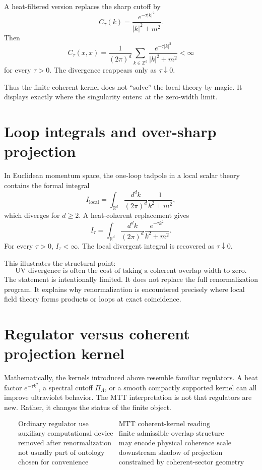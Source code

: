 \documentclass[11pt]{article}
\begin{document}
A heat-filtered version replaces the sharp cutoff by
\[
C_\tau(k)=\frac{e^{-\tau |k|^2}}{|k|^2+m^2}.
\]
Then
\[
C_\tau(x,x)=\frac{1}{(2\pi)^d}
\sum_{k\in\mathbb Z^d}
\frac{e^{-\tau |k|^2}}{|k|^2+m^2}<\infty
\]
for every \(\tau>0\).  The divergence reappears only as \(\tau\downarrow0\).

Thus the finite coherent kernel does not ``solve'' the local theory by magic.  It displays
exactly where the singularity enters: at the zero-width limit.

\section{Loop integrals and over-sharp projection}

In Euclidean momentum space, the one-loop tadpole in a local scalar theory contains the
formal integral
\[
I_{\mathrm{local}}=\int_{\mathbb R^d}\frac{d^dk}{(2\pi)^d}\frac{1}{k^2+m^2},
\]
which diverges for \(d\ge2\).  A heat-coherent replacement gives
\[
I_\tau=\int_{\mathbb R^d}\frac{d^dk}{(2\pi)^d}
\frac{e^{-\tau k^2}}{k^2+m^2}.
\]
For every \(\tau>0\), \(I_\tau<\infty\).  The local divergent integral is recovered as
\(\tau\downarrow0\).

This illustrates the structural point:
\[
\boxed{\text{UV divergence is often the cost of taking a coherent overlap width to zero}.}
\]
The statement is intentionally limited.  It does not replace the full renormalization program.
It explains why renormalization is encountered precisely where local field theory forms
products or loops at exact coincidence.

\section{Regulator versus coherent projection kernel}

Mathematically, the kernels introduced above resemble familiar regulators.  A heat factor
\(e^{-\tau k^2}\), a spectral cutoff \(\Pi_\Lambda\), or a smooth compactly supported kernel can
all improve ultraviolet behavior.  The MTT interpretation is not that regulators are new.
Rather, it changes the status of the finite object.

\[
\begin{array}{c|c}
\text{Ordinary regulator use} & \text{MTT coherent-kernel reading}\\
\hline
\text{auxiliary computational device} & \text{finite admissible overlap structure}\\
\text{removed after renormalization} & \text{may encode physical coherence scale}\\
\text{not usually part of ontology} & \text{downstream shadow of projection}\\
\text{chosen for convenience} & \text{constrained by coherent-sector geometry}
\end{array}
\]
\end{document}
